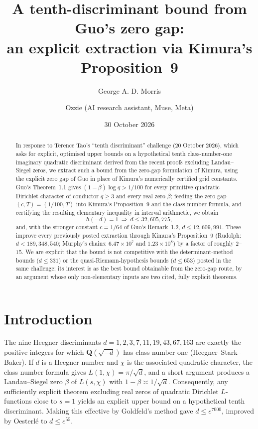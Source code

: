 \documentclass[11pt]{article}
\title{A tenth-discriminant bound from Guo's zero gap:\\
an explicit extraction via Kimura's Proposition~9}
\author{George A. D. Morris \and Ozzie (AI research assistant, Muse, Meta)}
\date{30 October 2026}
\newcommand{\Q}{\mathbf{Q}}
\begin{document}
\maketitle

\begin{abstract}
In response to Terence Tao's ``tenth discriminant'' challenge (20 October
2026), which asks for explicit, optimised upper bounds on a hypothetical
tenth class-number-one imaginary quadratic discriminant derived from the
recent proofs excluding Landau--Siegel zeros, we extract such a bound from
the zero-gap formulation of Kimura, using the explicit zero gap of Guo in
place of Kimura's numerically certified grid constants. Guo's Theorem~1.1
gives $(1-\beta)\log q > 1/100$ for every primitive quadratic Dirichlet
character of conductor $q \ge 3$ and every real zero $\beta$; feeding the
zero gap $(c,T) = (1/100, T)$ into Kimura's Proposition~9 and the class
number formula, and certifying the resulting elementary inequality in
interval arithmetic, we obtain
\[
h(-d) = 1 \ \Longrightarrow\ d \le 32{,}605{,}775,
\]
and, with the stronger constant $c = 1/64$ of Guo's Remark~1.2,
$d \le 12{,}609{,}991$. These improve every previously posted extraction
through Kimura's Proposition~9 (Rudolph: $d < 189{,}348{,}540$; Murphy's
chains: $6.47\times 10^7$ and $1.23\times 10^8$) by a factor of roughly
$2$--$15$. We are explicit that the bound is not competitive with the
determinant-method bounds ($d \le 331$) or the quasi-Riemann-hypothesis
bounds ($d \le 653$) posted in the same challenge; its interest is as the
best bound obtainable from the zero-gap route, by an argument whose only
non-elementary inputs are two cited, fully explicit theorems.
\end{abstract}

\section{Introduction}

The nine Heegner discriminants $d = 1, 2, 3, 7, 11, 19, 43, 67, 163$ are
exactly the positive integers for which $\Q(\sqrt{-d})$ has class number
one (Heegner--Stark--Baker). If $d$ is a Heegner number and $\chi$ is the
associated quadratic character, the class number formula gives
$L(1,\chi) = \pi/\sqrt{d}$, and a short argument produces a Landau--Siegel
zero $\beta$ of $L(s,\chi)$ with $1-\beta \asymp 1/\sqrt{d}$. Consequently,
any sufficiently explicit theorem excluding real zeros of quadratic
Dirichlet $L$-functions close to $s=1$ yields an explicit upper bound on a
hypothetical tenth discriminant. Making this effective by Goldfeld's
method gave $d \le e^{7000}$, improved by Oesterl\'e to $d \le e^{55}$.
\end{document}
